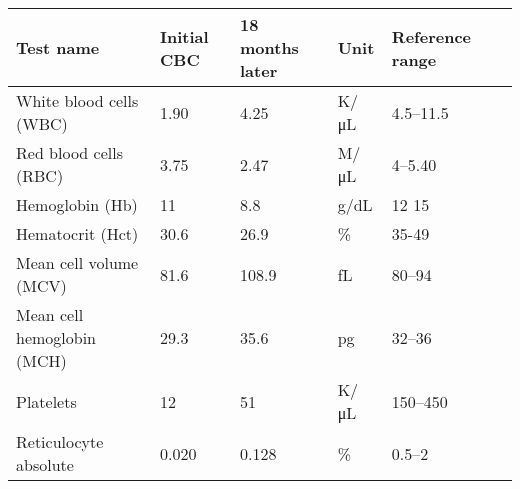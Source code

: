 \documentclass{article}
\begin{document}
    \begin{table}
\centering
\begin{tabular}{|l|l|l|l|l|l|}
\hline
Test name & Initial CBC & 18 months later & Unit & Reference range \\
\hline
White blood cells (WBC) & 1.90 & 4.25 & K/μL & 4.5–11.5 \\
Red blood cells (RBC) & 3.75 & 2.47 & M/μL & 4–5.40 \\
Hemoglobin (Hb) & 11 & 8.8 & g/dL & 12 15 \\
Hematocrit (Hct) & 30.6 & 26.9 & \% & 35-49 \\
Mean cell volume (MCV) & 81.6 & 108.9 & fL & 80–94 \\
Mean cell hemoglobin (MCH) & 29.3 & 35.6 & pg & 32–36 \\
Platelets & 12 & 51 & K/μL & 150–450 \\
Reticulocyte absolute & 0.020 & 0.128 & \% & 0.5–2 \\
\hline
\end{tabular}
\end{table}

    
\end{document}
